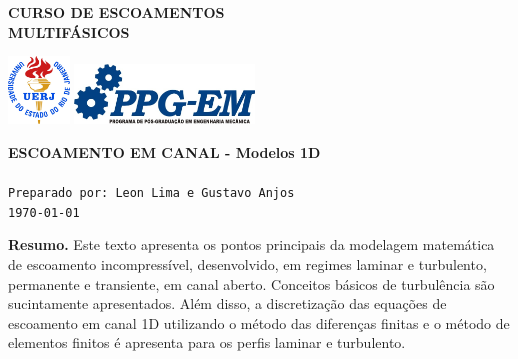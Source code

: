 \documentclass[a4paper,portuguese,10pt]{article}
\begin{document}
\thispagestyle{empty}

\begin{minipage}{0.5\linewidth}
	\large\textbf{CURSO DE ESCOAMENTOS\\MULTIFÁSICOS}
\end{minipage}
\begin{minipage}{0.5\linewidth}
	\flushright
	\includegraphics[height=18mm]{figs/logouerj.jpg}
	\hspace{.5cm}
	\includegraphics[height=16mm]{figs/logo_ppg-em.jpg}
\end{minipage}

\hrulefill

\Large \color{NavyBlue} \textbf{ESCOAMENTO EM CANAL - Modelos 1D}\\
\color{Black}\\ %
\normalsize \texttt{Preparado por: Leon Lima e Gustavo Anjos}\\
\normalsize \texttt{\today}


\hrulefill
\begin{center}
	\begin{minipage}{0.8\linewidth}
		\footnotesize{\textbf{Resumo.} Este texto apresenta os pontos
		principais da modelagem matemática de escoamento incompressível,
		desenvolvido, em regimes laminar e turbulento, permanente e
		transiente, em canal aberto. Conceitos básicos de turbulência
		são sucintamente apresentados. Além disso, a discretização das
		equações de escoamento em canal 1D utilizando o método das
		diferenças finitas e o método de elementos finitos é apresenta
		para os perfis laminar e turbulento.}
	\end{minipage}
\end{center}

{\footnotesize\tableofcontents}
\hrulefill\\
\onehalfspacing
\vspace{10mm}






\singlespacing




\end{document}
